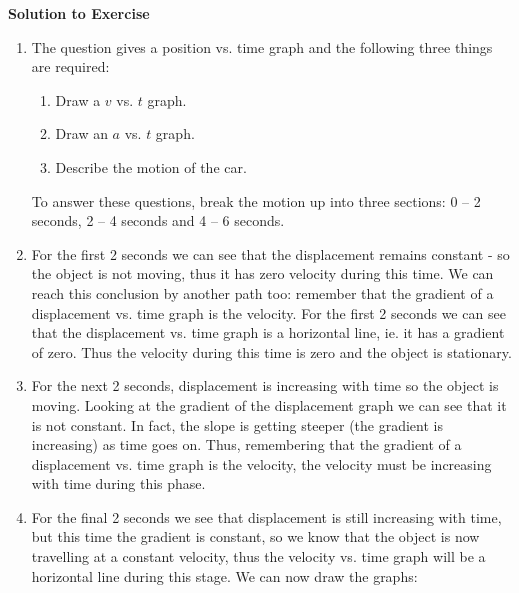 {\begin{mdframed}[linewidth=4, leftmargin=40, rightmargin=40]
\begin{exercise}
      \label{m38795*solfhsst!!!underscore!!!id3435}\noindent\textbf{Solution to Exercise } \label{m38795*listfhsst!!!underscore!!!id3435}\begin{enumerate}[noitemsep, label=\textbf{Step} \textbf{\arabic*}. ] 
            \leftskip=20pt\rightskip=\leftskip\item  
      \label{m38795*id73362}The question gives a position vs. time graph and the following three things are required:\par 
      \label{m38795*id73366}\begin{enumerate}[noitemsep, label=\textbf{\alph*}. ] 
            \leftskip=20pt\rightskip=\leftskip\label{m38795*uid124}\item Draw a $v$ vs. $t$ graph.
\label{m38795*uid125}\item Draw an $a$ vs. $t$ graph.
\label{m38795*uid126}\item Describe the motion of the car.
\end{enumerate}
      \label{m38795*id73443}To answer these questions, break the motion up into three sections: 0 -- 2 seconds, 2 -- 4 seconds and 4 -- 6 seconds.\par 
      \item  
      \label{m38795*id73455}For the first 2 seconds we can see that the displacement remains constant - so the object is not moving, thus it has zero velocity during this time. We can reach this conclusion by another path too: remember that the gradient of a displacement vs. time graph is the velocity. For the first 2 seconds we can see that the displacement vs. time graph is a horizontal line, ie. it has a gradient of zero. Thus the velocity during this time is zero and the object is stationary.\par 
      \item  
      \label{m38795*id73469}For the next 2 seconds, displacement is increasing with time so the object is moving. Looking at the gradient of the displacement graph we can see that it is not constant. In fact, the slope is getting steeper (the gradient is increasing) as time goes on. Thus, remembering that the gradient of a displacement vs. time graph is the velocity, the velocity must be increasing with time during this phase.\par 
      \item  
      \label{m38795*id73483}For the final 2 seconds we see that displacement is still increasing with time, but this time the gradient is constant, so we know that the object is now travelling at a constant velocity, thus the velocity vs. time graph will be a horizontal line during this stage. We can now draw the graphs:\par 

\end{enumerate}
\end{exercise}
\end{mdframed}}
